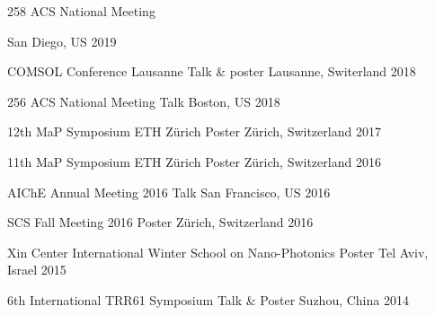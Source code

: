 
\begin{cvtalks}

   \cvtalk
  {258 ACS National Meeting}
  {
    \begin{refsection}
      \nocite{tian2018field}
      \nocite{li2018towards}
      \printbibliography[heading=none]
    \end{refsection}
  }
  {San Diego, US}
  {2019}
  
  \cvtalk
  {COMSOL Conference Lausanne}
  {Talk \& poster}
  {Lausanne, Switerland}
  {2018}

  \cvtalk
  {256 ACS National Meeting}
  {Talk}
  {Boston, US}
  {2018}

  \cvtalk
  {12th MaP Symposium ETH Z\"{u}rich}
  {Poster}
  {Z\"{u}rich, Switzerland}
  {2017}

  \cvtalk
  {11th MaP Symposium ETH Z\"{u}rich}
  {Poster}
  {Z\"{u}rich, Switzerland}
  {2016}

  \cvtalk
  {AIChE Annual Meeting 2016}
  {Talk}
  {San Francisco, US}
  {2016}

  \cvtalk
  {SCS Fall Meeting 2016}
  {Poster}
  {Z\"{u}rich, Switzerland}
  {2016}

  \cvtalk
  {Xin Center International Winter School on Nano-Photonics}
  {Poster}
  {Tel Aviv, Israel}
  {2015}

  \cvtalk
  {6th International TRR61 Symposium}
  {Talk \& Poster}
  {Suzhou, China}
  {2014}

\end{cvtalks}
